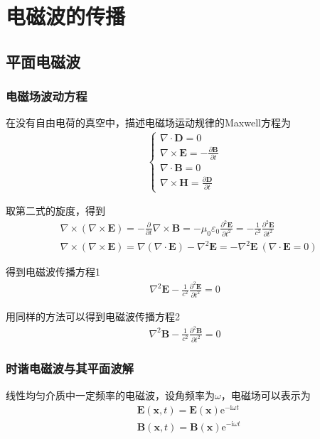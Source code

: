 \documentclass[main.tex]{subfiles}
\begin{document}
\chapter{电磁波的传播}
\section{平面电磁波}
\subsection{电磁场波动方程}
在没有自由电荷的真空中，描述电磁场运动规律的Maxwell方程为
\begin{align}
\label{Maxwell2}\left\{\begin{array}{l}
 \nabla \cdot \boldsymbol{D} = 0\\
 \nabla \times \boldsymbol{E} = -\frac{\partial \boldsymbol{B}}{\partial t}\\
\nabla \cdot  \boldsymbol{B} = 0\\
\nabla \times \boldsymbol{H} = \frac{\partial \boldsymbol{D}}{\partial t}
\end{array}\right.
\end{align}

取第二式的旋度，得到
\begin{align}
    &\nabla \times (\nabla \times \boldsymbol{E}) = -\frac{\partial }{\partial t} \nabla \times \boldsymbol{B} = -\mu_0 \varepsilon_0 \frac{\partial ^2 \boldsymbol{E}}{\partial t^2} = -\frac{1}{c^2}\frac{\partial ^2 \boldsymbol{E}}{\partial t^2}\\
    \label{xuandu5.1}&\nabla \times (\nabla \times \boldsymbol{E}) = \nabla(\nabla \cdot \boldsymbol{E}) - \nabla ^2 \boldsymbol{E} = -\nabla ^2 \boldsymbol{E}\ (\nabla \cdot \boldsymbol{E} = 0)
\end{align}

得到电磁波传播方程1
\begin{align}
    \nabla ^2 \boldsymbol{E} - \frac{1}{c^2}\frac{\partial ^2 \boldsymbol{E}}{\partial t^2} = 0
\end{align}

用同样的方法可以得到电磁波传播方程2
\begin{align}
    \nabla ^2 \boldsymbol{B} - \frac{1}{c^2}\frac{\partial ^2 \boldsymbol{B}}{\partial t^2} = 0
\end{align}

\subsection{时谐电磁波与其平面波解}
线性均匀介质中一定频率的电磁波，设角频率为$\omega$，电磁场可以表示为
\begin{align}
    \label{hanshiE}&\boldsymbol{E} (\boldsymbol{x}, t) = \boldsymbol{E}(\boldsymbol{x})\mathrm{e}^{-\mathrm{i}\omega t}\\
    &\boldsymbol{B} (\boldsymbol{x}, t) = \boldsymbol{B}(\boldsymbol{x})\mathrm{e}^{-\mathrm{i}\omega t}
\end{align}
\end{document}
